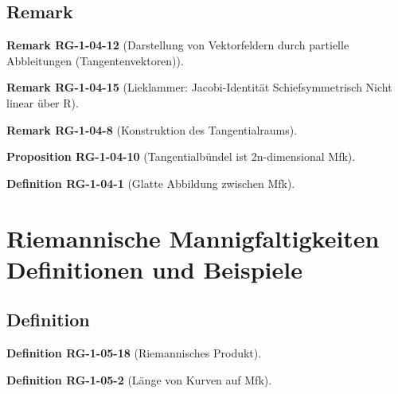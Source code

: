 \documentclass[10pt, letterpaper]{article}
\newcommand{\CustomHeading}[3]{%
  \par\medskip\noindent%
  \textbf{#1 #2} \textnormal{(#3)}.\enskip%
}
\newenvironment{DEF}[2]{\CustomHeading{Definition}{#1}{#2}}{}
\newenvironment{PROP}[2]{\CustomHeading{Proposition}{#1}{#2}}{}
\newenvironment{REM}[2]{\CustomHeading{Remark}{#1}{#2}}{}
\begin{document}
\subsection{Remark}



\begin{REM}{RG-1-04-12}{Darstellung von Vektorfeldern durch partielle Abbleitungen (Tangentenvektoren)}

\end{REM}

\begin{REM}{RG-1-04-15}{Lieklammer:
Jacobi-Identität
Schiefsymmetrisch
Nicht linear über R}

\end{REM}

\begin{REM}{RG-1-04-8}{Konstruktion des Tangentialraums}

\end{REM}









\begin{PROP}{RG-1-04-10}{Tangentialbündel ist 2n-dimensional Mfk}

\end{PROP}





\begin{DEF}{RG-1-04-1}{Glatte Abbildung zwischen Mfk}

\end{DEF}







\section{Riemannische Mannigfaltigkeiten Definitionen und Beispiele}

\subsection{Definition}

\begin{DEF}{RG-1-05-18}{Riemannisches Produkt}

\end{DEF}

\begin{DEF}{RG-1-05-2}{Länge von Kurven auf Mfk}

\end{DEF}
\end{document}
